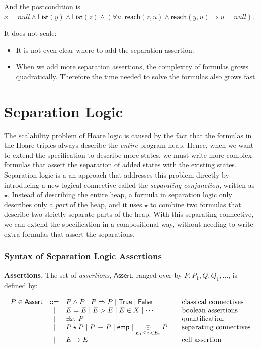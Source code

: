 \documentclass[11pt]{article}
\newcommand{\List}{\mathsf{List}}
\newcommand{\reach}{\mathsf{reach}}
\newcommand{\Assert}{\mathsf{Assert}}
\newcommand{\True}{\mathsf{True}}
\newcommand{\False}{\mathsf{False}}
\newcommand{\Emp}{\mathsf{emp}}
\newcommand{\sepimp}{\mathrel{-\mkern-6mu\ast}}
\begin{document}
And the postcondition is $x = null \land \List(y) \land \List(z) \land 
(\forall u.\ \reach(z, u) \land \reach(y, u) \Rightarrow u = null)$.


It does not scale:
\begin{itemize}
  \item It is not even clear where to add the separation assertion.
  \item When we add more separation assertions, the complexity of formulas grows
  quadratically. Therefore the time needed to solve the formulas also grows fast.
\end{itemize}

\section{Separation Logic}
The scalability problem of Hoare logic is caused by the fact that the formulas
in the Hoare triples always describe the \emph{entire} program heap.
Hence, when we want to extend the specification to describe more states, we must
write more complex formulas that assert the separation of added states with the
existing states.
Separation logic is a an approach that addresses this problem directly by
introducing a new logical connective called the \textit{separating conjunction},
written as $\star$.
Instead of describing the entire heap, a formula in separation logic only
describes only a \emph{part} of the heap, and it uses $\star$ to combine two
formulas that describe two strictly separate parts of the heap.
With this separating connective, we can extend the specification in a
compositional way, without needing to write extra formulas that assert the
separations.

\subsubsection*{Syntax of Separation Logic Assertions}
\textbf{Assertions.}
The set of \emph{assertions}, $\Assert$, ranged over by
$P, P_1, Q, Q_1, \ldots$, is defined by:

\[
\begin{array}{rcl@{\qquad}l}
P \in \Assert & ::= &
P \land P \mid P \Rightarrow P \mid \True \mid \False
& \text{classical connectives} \\
& \mid &
E = E \mid E > E \mid E \in X \mid \cdots
& \text{boolean assertions} \\
& \mid &
\exists x.\ P
& \text{quantification} \\
& \mid &
P \star P \mid P \sepimp P \mid \Emp
\mid \displaystyle\mathop{\circledast}_{E_1 \le x < E_2} P
& \text{separating connectives} \\
& \mid &
E \mapsto E
& \text{cell assertion}
\end{array}
\]
\end{document}
